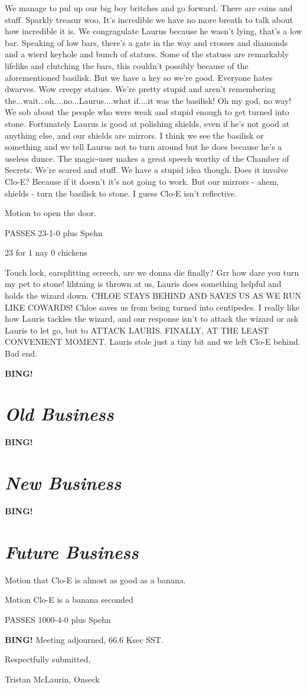 \documentclass[10pt]{article}
\newcommand{\bing}{{\bf BING!} }
\newcommand{\goto}[1]{\bing \vskip 12pt \section*{{\em{#1}}}}
\newcommand{\ps}{ plus Spehn\xspace}
\newcommand{\onseck}{Tristan McLaurin, Onseck}
\begin{document}
We manage to pul up our big boy britches and go forward. There are coins and stuff. Sparkly treasur woo. It's incredible we have no more breath to talk about how incredible it is. We congragulate Laurus because he wasn't lying, that's a low bar. Speaking of low bars, there's a gate in the way and crosses and diamonds and a wierd keyhole and bunch of statues. Some of the statues are remarkably lifelike and clutching the bars, this couldn't possibly because of the aforementioned basilisk. But we have a key so we're good. Everyone hates dwarves. Wow creepy statues. We're pretty stupid and aren't remembering the...wait...oh....no...Laurus....what if....it was the basilisk! Oh my god, no way! We sob about the people who were weak and stupid enough to get turned into stone. Fortunately Laurus is good at polishing shields, even if he's not good at anything else, and our shields are mirrors. I think we see the basilisk or something and we tell Laurus not to turn around but he does because he's a useless dunce. The magic-user makes a great speech worthy of the Chamber of Secrets. We're scared and stuff. We have a stupid idea though. Does it involve Clo-E? Because if it doesn't it's not going to work. But our mirrors - ahem, shields - turn the basilisk to stone. I guess Clo-E isn't reflective. 

Motion to open the door.

PASSES 23-1-0\ps

23 for
1 nay
0 chickens

Touch lock, earsplitting screech, are we donna die finally? Grr how dare you turn my pet to stone! lihtning is thrown at us, Lauris does something helpful and holds the wizard down. CHLOE STAYS BEHIND AND SAVES US AS WE RUN LIKE COWARDS! Chloe saves us from being turned into centipedes. I really like how Lauris tackles the wizard, and our response isn't to attack the wizard or ask Lauris to let go, but to ATTACK LAURIS. FINALLY, AT THE LEAST CONVENIENT MOMENT. Lauris stole just a tiny bit and we left Clo-E behind. Bad end. 

\goto{Old Business}

\goto{New Business}

\goto{Future Business}
Motion that Clo-E is almost as good as a banana.

Motion Clo-E is a banana seconded

PASSES 1000-4-0\ps

\bing
\noindent
Meeting adjourned, 66.6 Ksec SST.

\vspace{18pt}

\centerline{Respectfully submitted,}
\centerline{\onseck}
\end{document}
